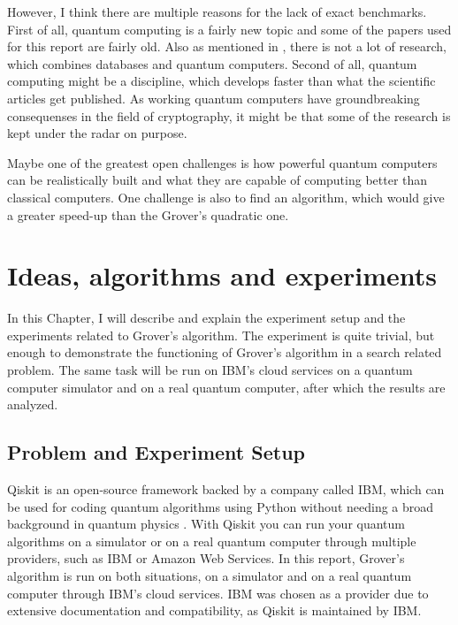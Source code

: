 \documentclass[english,oneside,openright]{UH_DS_report}
\begin{document}
However, I think there are multiple reasons for the lack of exact benchmarks. First of all, quantum computing is a fairly new topic and some of the papers used for this report are fairly old. Also as mentioned in \cite{qcdb}, there is not a lot of research, which combines databases and quantum computers. Second of all, quantum computing might be a discipline, which develops faster than what the scientific articles get published. As working quantum computers have groundbreaking consequenses in the field of cryptography, it might be that some of the research is kept under the radar on purpose.

Maybe one of the greatest open challenges is how powerful quantum computers can be realistically built and what they are capable of computing better than classical computers. One challenge is also to find an algorithm, which would give a greater speed-up than the Grover's quadratic one.

\chapter{Ideas, algorithms and experiments}
\label{chapter:ideas}

In this Chapter, I will describe and explain the experiment setup and the experiments related to Grover's algorithm. The experiment is quite trivial, but enough to demonstrate the functioning of Grover's algorithm in a search related problem. The same task will be run on IBM's cloud services on a quantum computer simulator and on a real quantum computer, after which the results are analyzed.

\section{Problem and Experiment Setup}
Qiskit is an open-source framework backed by a company called IBM, which can be used for coding quantum algorithms using Python without needing a broad background in quantum physics \cite{https://doi.org/10.48550/arxiv.1903.04359}. With Qiskit you can run your quantum algorithms on a simulator or on a real quantum computer through multiple providers, such as IBM or Amazon Web Services. In this report, Grover's algorithm is run on both situations, on a simulator and on a real quantum computer through IBM's cloud services. IBM was chosen as a provider due to extensive documentation and compatibility, as Qiskit is maintained by IBM.
\end{document}

